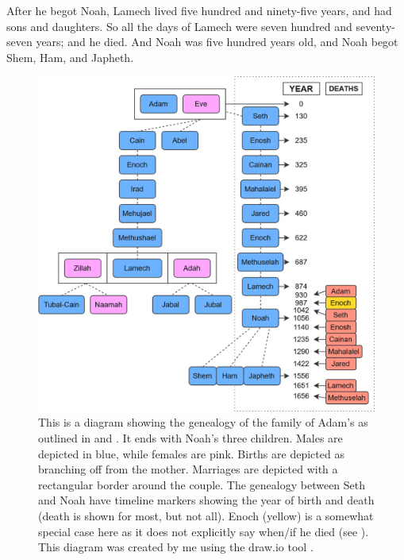 \bverse After he begot Noah, Lamech lived five hundred and ninety-five years, and had sons and daughters.
\bverse So all the days of Lamech were seven hundred and seventy-seven years; and he died.
\bverse And Noah was five hundred years old, and Noah begot Shem, Ham, and Japheth.




\begin{figure}[htbp] %
  \centering
  \includegraphics[width=\linewidth]{images/genealogies/noahs_genealogy.png}
  \caption{This is a diagram showing the genealogy of the family of Adam's as outlined in  and . It ends with Noah's three children. Males are depicted in blue, while females are pink. Births are depicted as branching off from the mother. Marriages are depicted with a rectangular border around the couple. The genealogy between Seth and Noah have timeline markers showing the year of birth and death (death is shown for most, but not all). Enoch (yellow) is a somewhat special case here as it does not explicitly say when/if he died (see ). This diagram was created by me using the draw.io tool \cite{draw.io}.}
  \label{fig:noahs_genealogy}
\end{figure}